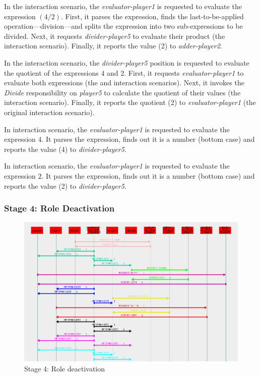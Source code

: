In the {} interaction scenario, the \textit{evaluator-player1} is requested to evaluate the expression $(4/2)$.
First, it parses the expression, finds the last-to-be-applied operation---division---and splits the expression into two sub-expressions to be divided.
Next, it requests \textit{divider-player5} to evaluate their product (the {} interaction scenario).
Finally, it reports the value (2) to \textit{adder-player2}.

In the {} interaction scenario, the \textit{divider-player5} position is requested to evaluate the quotient of the expressions $4$ and $2$.
First, it requests \textit{evaluator-player1} to evaluate both expressions (the {} and {} interaction scenarios).
Next, it invokes the \textit{Divide} responsibility on \textit{player5} to calculate the quotient of their values (the {} interaction scenario).
Finally, it reports the quotient (2) to \textit{evaluator-player1} (the original {} interaction scenario).

In {} interaction scenario, the \textit{evaluator-player1} is requested to evaluate the expression $4$.
It parses the expression, finds out it is a number (bottom case) and reports the value (4) to \textit{divider-player5}.

In {} interaction scenario, the \textit{evaluator-player1} is requested to evaluate the expression $2$.
It parses the expression, finds out it is a number (bottom case) and reports the value (2) to \textit{divider-player5}.

\subsubsection*{Stage 4: Role Deactivation}

\begin{figure}[H]
	\centering
	\includegraphics[width=\textwidth]{images/examples/example2-stage4.png}
	\caption{Stage 4: Role deactivation}
	\label{figure:example2-stage4}
\end{figure}

